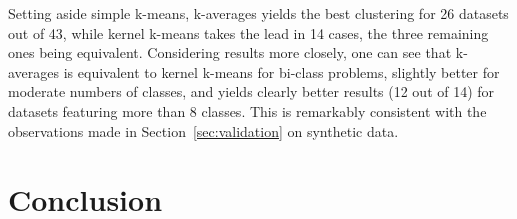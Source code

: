 \documentclass[a4paper,twoside]{article}
\begin{document}
Setting aside simple k-means, k-averages yields the best clustering for 26 datasets out of 43, while kernel k-means takes the lead in 14 cases, the three remaining ones being equivalent. Considering results more closely, one can see that k-averages is equivalent to kernel k-means for bi-class problems, slightly better for moderate numbers of classes, and yields clearly better results (12 out of 14) for datasets featuring more than 8 classes. This is remarkably consistent with the observations made in Section~\ref{sec:validation} on synthetic data.

\section{Conclusion}



\end{document}
